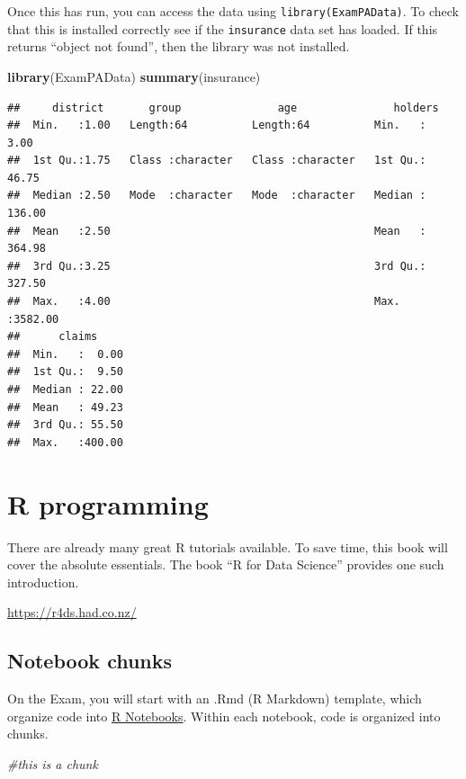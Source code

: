 \documentclass[]{book}
\newenvironment{Shaded}{\begin{snugshade}}{\end{snugshade}}
\newcommand{\CommentTok}[1]{\textcolor[rgb]{0.56,0.35,0.01}{\textit{#1}}}
\newcommand{\KeywordTok}[1]{\textcolor[rgb]{0.13,0.29,0.53}{\textbf{#1}}}
\newcommand{\NormalTok}[1]{#1}
\begin{document}
Once this has run, you can access the data using \texttt{library(ExamPAData)}. To check that this is installed correctly see if the \texttt{insurance} data set has loaded. If this returns ``object not found'', then the library was not installed.

\begin{Shaded}
\begin{Highlighting}[]
\KeywordTok{library}\NormalTok{(ExamPAData)}
\KeywordTok{summary}\NormalTok{(insurance)}
\end{Highlighting}
\end{Shaded}

\begin{verbatim}
##     district       group               age               holders       
##  Min.   :1.00   Length:64          Length:64          Min.   :   3.00  
##  1st Qu.:1.75   Class :character   Class :character   1st Qu.:  46.75  
##  Median :2.50   Mode  :character   Mode  :character   Median : 136.00  
##  Mean   :2.50                                         Mean   : 364.98  
##  3rd Qu.:3.25                                         3rd Qu.: 327.50  
##  Max.   :4.00                                         Max.   :3582.00  
##      claims      
##  Min.   :  0.00  
##  1st Qu.:  9.50  
##  Median : 22.00  
##  Mean   : 49.23  
##  3rd Qu.: 55.50  
##  Max.   :400.00
\end{verbatim}

\hypertarget{r-programming}{%
\chapter{R programming}\label{r-programming}}

There are already many great R tutorials available. To save time, this book will cover the absolute essentials. The book ``R for Data Science'' provides one such introduction.

\url{https://r4ds.had.co.nz/}

\hypertarget{notebook-chunks}{%
\section{Notebook chunks}\label{notebook-chunks}}

On the Exam, you will start with an .Rmd (R Markdown) template, which organize code into \href{https://bookdown.org/yihui/rmarkdown/notebook.html}{R Notebooks}. Within each notebook, code is organized into chunks.

\begin{Shaded}
\begin{Highlighting}[]
\CommentTok{#this is a chunk}
\end{Highlighting}
\end{Shaded}
\end{document}
